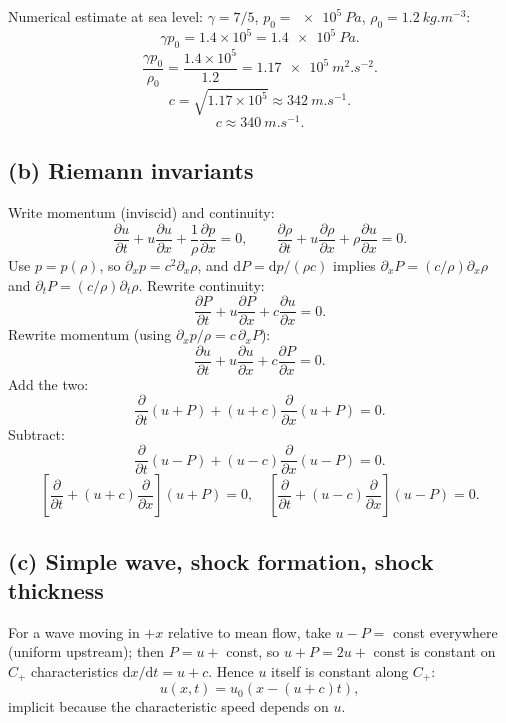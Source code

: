 \documentclass[11pt]{article}
\newcommand{\de}{\mathrm{d}}
\newcommand{\pd}[2]{\frac{\partial #1}{\partial #2}}
\begin{document}
Numerical estimate at sea level: $\gamma=7/5$, $p_0=\SI{e5}{Pa}$, $\rho_0=\SI{1.2}{kg.m^{-3}}$:
\[ \gamma p_0 = 1.4 \times 10^5 = \SI{1.4e5}{Pa}. \]
\[ \frac{\gamma p_0}{\rho_0} = \frac{1.4\times 10^5}{1.2} = \SI{1.17e5}{m^2.s^{-2}}. \]
\[ c = \sqrt{1.17\times 10^5} \approx \SI{342}{m.s^{-1}}. \]
\[ \boxed{\;c \approx \SI{340}{m.s^{-1}}.\;} \]

\subsection*{(b) Riemann invariants}

Write momentum (inviscid) and continuity:
\[ \pd{u}{t} + u\pd{u}{x} + \frac{1}{\rho}\pd{p}{x} = 0,\qquad \pd{\rho}{t} + u\pd{\rho}{x} + \rho\pd{u}{x} = 0. \]
Use $p=p(\rho)$, so $\partial_x p = c^2\partial_x\rho$, and $\de P = \de p/(\rho c)$ implies $\partial_x P = (c/\rho)\partial_x\rho$ and $\partial_t P = (c/\rho)\partial_t\rho$. Rewrite continuity:
\[ \pd{P}{t} + u\pd{P}{x} + c\pd{u}{x} = 0. \]
Rewrite momentum (using $\partial_x p/\rho = c\,\partial_x P$):
\[ \pd{u}{t} + u\pd{u}{x} + c\pd{P}{x} = 0. \]
Add the two:
\[ \pd{}{t}(u+P) + (u+c)\pd{}{x}(u+P) = 0. \]
Subtract:
\[ \pd{}{t}(u-P) + (u-c)\pd{}{x}(u-P) = 0. \]
\begin{equation}
\boxed{\;\left[\pd{}{t}+(u+c)\pd{}{x}\right](u+P)=0,\quad \left[\pd{}{t}+(u-c)\pd{}{x}\right](u-P)=0.\;}
\label{eq:Riemann}
\end{equation}

\subsection*{(c) Simple wave, shock formation, shock thickness}

For a wave moving in $+x$ relative to mean flow, take $u-P=$ const everywhere (uniform upstream); then $P = u + $ const, so $u+P = 2u+$ const is constant on $C_+$ characteristics $\de x/\de t = u+c$. Hence $u$ itself is constant along $C_+$:
\begin{equation}
\boxed{\;u(x,t) = u_0\!\left(x - (u+c)t\right),\;}
\label{eq:simple}
\end{equation}
implicit because the characteristic speed depends on $u$.

\begin{center}
\end{center}
\end{document}
